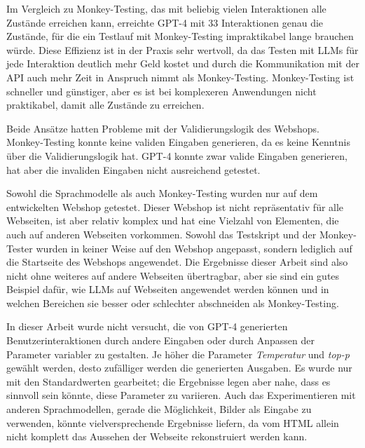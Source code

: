 Im Vergleich zu Monkey-Testing, das mit beliebig vielen Interaktionen alle Zustände erreichen kann, erreichte GPT-4 mit 33 Interaktionen genau die Zustände, für die ein Testlauf mit Monkey-Testing impraktikabel lange brauchen würde.
Diese Effizienz ist in der Praxis sehr wertvoll, da das Testen mit LLMs für jede Interaktion deutlich mehr Geld kostet und durch die Kommunikation mit der API auch mehr Zeit in Anspruch nimmt als Monkey-Testing.
Monkey-Testing ist schneller und günstiger, aber es ist bei komplexeren Anwendungen nicht praktikabel, damit alle Zustände zu erreichen.

Beide Ansätze hatten Probleme mit der Validierungslogik des Webshops.
Monkey-Testing konnte keine validen Eingaben generieren, da es keine Kenntnis über die Validierungslogik hat.
GPT-4 konnte zwar valide Eingaben generieren, hat aber die invaliden Eingaben nicht ausreichend getestet.

Sowohl die Sprachmodelle als auch Monkey-Testing wurden nur auf dem entwickelten Webshop getestet.
Dieser Webshop ist nicht repräsentativ für alle Webseiten, ist  aber relativ komplex und hat eine Vielzahl von Elementen, die auch auf anderen Webseiten vorkommen.
Sowohl das Testskript und der Monkey-Tester wurden in keiner Weise auf den Webshop angepasst, sondern lediglich auf die Startseite des Webshops angewendet.
Die Ergebnisse dieser Arbeit sind also nicht ohne weiteres auf andere Webseiten übertragbar, aber sie sind ein gutes Beispiel dafür, wie LLMs auf Webseiten angewendet werden können und in welchen Bereichen sie besser oder schlechter abschneiden als Monkey-Testing.

In dieser Arbeit wurde nicht versucht, die von GPT-4 generierten Benutzerinteraktionen durch andere Eingaben oder durch Anpassen der Parameter variabler zu gestalten.
Je höher die Parameter \textit{Temperatur} und \textit{top-p} gewählt werden, desto zufälliger werden die generierten Ausgaben.
Es wurde nur mit den Standardwerten gearbeitet; die Ergebnisse legen aber nahe, dass es sinnvoll sein könnte, diese Parameter zu variieren.
Auch das Experimentieren mit anderen Sprachmodellen, gerade die Möglichkeit, Bilder als Eingabe zu verwenden, könnte vielversprechende Ergebnisse liefern, da vom HTML allein nicht komplett das Aussehen der Webseite rekonstruiert werden kann.
